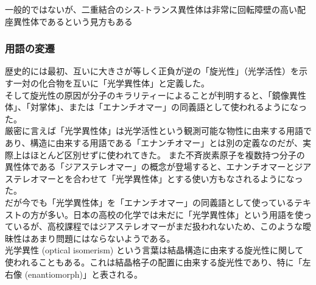 \documentclass[dvipdfmx,uplatex,twocolumn,10pt]{jsarticle}
\begin{document}
一般的ではないが、二重結合のシス-トランス異性体は非常に回転障壁の高い配座異性体であるという見方もある \\

\subsubsection{用語の変遷}
歴史的には最初、互いに大きさが等しく正負が逆の「旋光性」（光学活性）を示す一対の化合物を互いに「光学異性体」と定義した。 \\
そして旋光性の原因が分子のキラリティーによることが判明すると、「鏡像異性体」、「対掌体」、または「エナンチオマー」の同義語として使われるようになった。 \\
厳密に言えば「光学異性体」は光学活性という観測可能な物性に由来する用語であり、構造に由来する用語である「エナンチオマー」とは別の定義なのだが、実際上はほとんど区別せずに使われてきた。 
また不斉炭素原子を複数持つ分子の異性体である「ジアステレオマー」の概念が登場すると、エナンチオマーとジアステレオマーとを合わせて「光学異性体」とする使い方もなされるようになった。 \\
だが今でも「光学異性体」を「エナンチオマー」の同義語として使っているテキストの方が多い。日本の高校の化学では未だに「光学異性体」という用語を使っているが、高校課程ではジアステレオマーがまだ扱われないため、このような曖昧性はあまり問題にはならないようである。 \\

光学異性 (optical isomerism) という言葉は結晶構造に由来する旋光性に関して使われることもある。これは結晶格子の配置に由来する旋光性であり、特に「左右像 (enantiomorph)」と表される。
\end{document}
